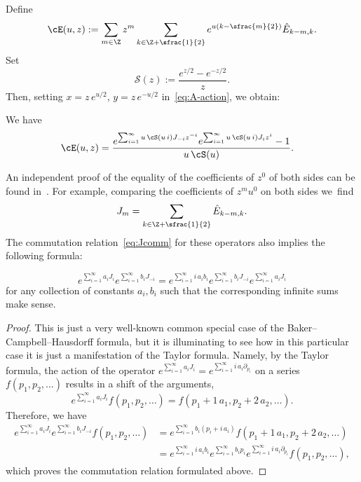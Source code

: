 Define
\begin{equation}\label{eq:cEdef}
\cE(u,z):=\sum_{m\in\Z}z^m \sum_{k\in\Z+\sfrac{1}{2}}
e^{u(k-\sfrac{m}{2})} \hat{E}_{k-m,k}.
\end{equation}
Set
\begin{equation}\label{eq:Sdef}
\mathcal{S}(z):= \dfrac{e^{z/2}-e^{-z/2}}{z}.
\end{equation}
Then, setting $x=z\,e^{u/2}$, $y=z\,e^{-u/2}$ in~\eqref{eq:A-action}, we obtain:

\begin{proposition} We have
\begin{align}\label{eq:cEform}
\cE(u,z)
&=\frac{
e^{\sum_{i=1}^\infty u\,\cS(u\,i) J_{-i}z^{-i}}
e^{\sum_{i=1}^\infty u\,\cS(u\,i) J_{i}z^{i}} -1 }
{u\,\cS(u)}.
\end{align}
\end{proposition}

An independent proof of the equality of the coefficients of $z^0$ of both sides can be found in~\cite{SSZ12}.
For example, comparing the coefficients of $z^mu^0$ on both sides we~find
\begin{equation*}
J_m=\sum_{k\in\Z+\sfrac{1}{2}}\hat E_{k-m,k}.
\end{equation*}
The commutation relation~\eqref{eq:Jcomm} for these operators also implies the following formula:

\skpt
\begin{proposition}\mbox{}\vspace*{-1.2\baselineskip}
\begin{equation}\label{eq:expJcomm}
e^{\sum_{i=1}^\infty a_i J_i}
e^{\sum_{i=1}^\infty b_i J_{-i}}=
e^{\sum_{i=1}^\infty i \,a_ib_i}
e^{\sum_{i=1}^\infty b_i J_{-i}}
e^{\sum_{i=1}^\infty a_i J_i}
\end{equation}
for any collection of constants $a_i,b_i$ such that the corresponding infinite sums make sense.
\end{proposition}

\begin{proof}
This is just a very well-known common special case of the Baker--Campbell--Hausdorff formula, but it is illuminating to see how in this particular case it is just a manifestation of the Taylor formula. Namely, by the Taylor formula, the action of the operator $e^{\sum_{i=1}^\infty a_i J_i}=e^{\sum_{i=1}^\infty i\,a_i \partial_{p_i}}$ on a series $f(p_1,p_2,\dots)$ results in a shift of the arguments,
\begin{equation*}
e^{\sum_{i=1}^\infty a_i J_i}f(p_1,p_2,\dots)
=f(p_1+1\,a_1,p_2+2\,a_2,\dots).
\end{equation*}
Therefore, we have
\begin{align*}
e^{\sum_{i=1}^\infty a_i J_i}
e^{\sum_{i=1}^\infty b_i J_{-i}}f(p_1,p_2,\dots)&=
e^{\sum_{i=1}^\infty b_i (p_i+i\,a_i)}
f(p_1+1\,a_1,p_2+2\,a_2,\dots)
\\ &
=e^{\sum_{i=1}^\infty i\,a_ib_i}
e^{\sum_{i=1}^\infty b_i p_i}
e^{\sum_{i=1}^\infty i\,a_i \partial_{p_i}}f(p_1,p_2,\dots),
\end{align*}
which proves the commutation relation formulated above.
\end{proof}

